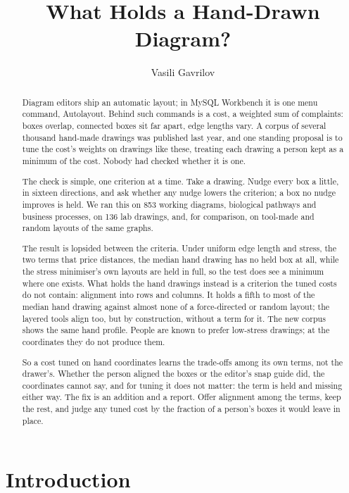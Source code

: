 \documentclass[a4paper,UKenglish]{gd-lipics-v3}
\title{What Holds a Hand-Drawn Diagram?}
\author{Vasili Gavrilov}{Independent researcher}{gavr144@gmail.com}{}{}
\begin{document}
\maketitle
\begin{abstract}
Diagram editors ship an automatic layout; in MySQL Workbench it is one menu command,
Autolayout. Behind such commands is a cost, a weighted sum of complaints: boxes
overlap, connected boxes sit far apart, edge lengths vary. A corpus of several thousand
hand-made drawings was published last year, and one standing proposal is to tune the
cost's weights on drawings like these, treating each drawing a person kept as a minimum
of the cost. Nobody had checked whether it is one.

The check is simple, one criterion at a time. Take a drawing. Nudge every box a little,
in sixteen directions, and ask whether any nudge lowers the criterion; a box no nudge
improves is held. We ran this on 853 working diagrams, biological pathways and business
processes, on 136 lab drawings, and, for comparison, on tool-made and random layouts of
the same graphs.

The result is lopsided between the criteria. Under uniform edge length and stress, the
two terms that price distances, the median hand drawing has no held box at all, while
the stress minimiser's own layouts are held in full, so the test does see a minimum
where one exists. What holds the hand drawings instead is a criterion the tuned costs
do not contain: alignment into rows and columns. It holds a fifth to most of the median
hand drawing against almost none of a force-directed or random layout; the layered
tools align too, but by construction, without a term for it. The new corpus shows the
same hand profile. People are known to prefer low-stress drawings; at the coordinates
they do not produce them.

So a cost tuned on hand coordinates learns the trade-offs among its own terms, not the
drawer's. Whether the person aligned the boxes or the editor's snap guide did, the
coordinates cannot say, and for tuning it does not matter: the term is held and missing
either way. The fix is an addition and a report. Offer alignment among the terms, keep
the rest, and judge any tuned cost by the fraction of a person's boxes it would leave
in place.
\end{abstract}

\section{Introduction}
\end{document}
